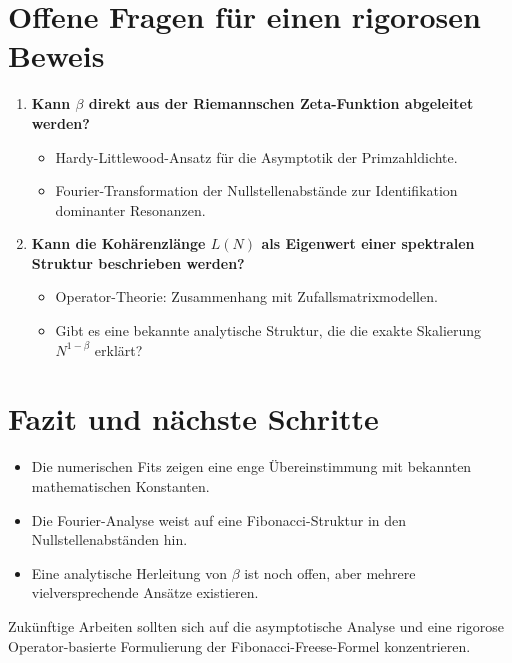 \documentclass[a4paper,12pt]{article}
\begin{document}
\section{Offene Fragen für einen rigorosen Beweis}
\begin{enumerate}
    \item \textbf{Kann $\beta$ direkt aus der Riemannschen Zeta-Funktion abgeleitet werden?}
    \begin{itemize}
        \item Hardy-Littlewood-Ansatz für die Asymptotik der Primzahldichte.
        \item Fourier-Transformation der Nullstellenabstände zur Identifikation dominanter Resonanzen.
    \end{itemize}
    
    \item \textbf{Kann die Kohärenzlänge $L(N)$ als Eigenwert einer spektralen Struktur beschrieben werden?}
    \begin{itemize}
        \item Operator-Theorie: Zusammenhang mit Zufallsmatrixmodellen.
        \item Gibt es eine bekannte analytische Struktur, die die exakte Skalierung $N^{1-\beta}$ erklärt?
    \end{itemize}
\end{enumerate}

\section{Fazit und nächste Schritte}
\begin{itemize}
    \item Die numerischen Fits zeigen eine enge Übereinstimmung mit bekannten mathematischen Konstanten.
    \item Die Fourier-Analyse weist auf eine Fibonacci-Struktur in den Nullstellenabständen hin.
    \item Eine analytische Herleitung von $\beta$ ist noch offen, aber mehrere vielversprechende Ansätze existieren.
\end{itemize}

Zukünftige Arbeiten sollten sich auf die asymptotische Analyse und eine rigorose Operator-basierte Formulierung der Fibonacci-Freese-Formel konzentrieren.
\end{document}

